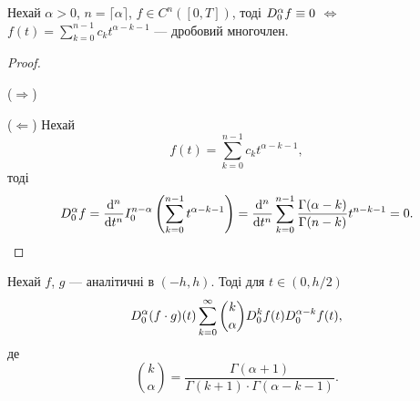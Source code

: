 \begin{theorem}
    Нехай $\alpha > 0$, $n = \lceil \alpha \rceil$, $f \in C^n([0, T])$, тоді $D_0^{\alpha} f \equiv 0$ $\iff$ $f(t) = \sum_{k = 0}^{n - 1} c_k t^{\alpha - k - 1}$ --- дробовий многочлен.
\end{theorem}
\begin{proof}
    $\left.\right.$
    \begin{exercise}
        ($\Longrightarrow$)
    \end{exercise}
    
    ($\Longleftarrow$) Нехай
    \begin{equation}
        f(t) = \sum_{k = 0}^{n - 1} c_k t^{\alpha - k - 1},
    \end{equation}
    тоді 
    \begin{equation}
        D_0^{\alpha} f = \frac{\mathop{}\!\mathrm{d}^n}{\mathop{}\!\mathrm{d} t^n} I_0^{n - \alpha} \left( \sum_{k = 0}^{n - 1} t^{\alpha - k - 1} \right) = \frac{\mathop{}\!\mathrm{d}^n}{\mathop{}\!\mathrm{d} t^n} \sum_{k = 0}^{n - 1} \frac{\Gamma(\alpha - k)}{\Gamma(n - k)} t^{n - k - 1} = 0.
    \end{equation}
\end{proof}

\begin{theorem}
    Нехай $f$, $g$ --- аналітичні в $(-h, h)$. Тоді для $t \in (0, h/2)$
    \begin{equation}
        D_0^{\alpha} (f \cdot g) (t) \sum_{k = 0}^\infty \binom{k}{\alpha} D_0^{k} f(t) D_0^{\alpha - k} f(t),
    \end{equation}
    де
    \begin{equation}
        \binom{k}{\alpha} = \frac{\Gamma(\alpha + 1)}{\Gamma(k + 1) \cdot \Gamma(\alpha - k - 1)}.
    \end{equation}
\end{theorem}

